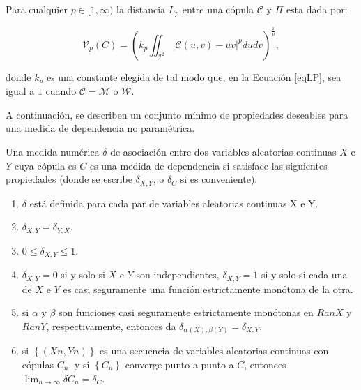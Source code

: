 \begin{defn}\label{lp}
    Para cualquier $p \in[1, \infty)$ la distancia $L_p$ entre una cópula $\mathcal{C}$ y $\Pi$ esta dada por:

    \begin{equation}\label{eqLP}
        \mathcal{V}_p(C)=\left(k_p \iint_{\mathcal{I}^2}|\mathcal{C}(u, v)-u v|^p d u d v\right)^{\frac{1}{p}},
    \end{equation}

    donde $k_p$ es una constante elegida de tal modo que, en la Ecuación \eqref{eqLP}, sea igual a $1$ cuando $\mathcal{C}=\mathcal{M}$ o $\mathcal{W}$.
\end{defn}


A continuación, se describen un conjunto mínimo de propiedades deseables para una medida de dependencia no paramétrica. 

\begin{defn}
    Una medida numérica $\delta$ de asociación entre dos variables aleatorias continuas $X$ e $Y$ cuya cópula es $C$ es una medida de dependencia si satisface las siguientes propiedades (donde se escribe $\delta_{X,Y}$, o $\delta_C$ si es conveniente):

    \begin{enumerate}
        \item $\delta$ está definida para cada par de variables aleatorias continuas X e Y.
        \item $\delta_{X,Y} = \delta_{Y,X}$.
        \item $0 \leq \delta_ {X,Y} \leq 1$.
        \item  $\delta_{X,Y} = 0$ si y solo si $X$ e $Y$ son independientes, $\delta_{X,Y} = 1$ si y solo si cada una de $X$ e $Y$ es casi seguramente una función estrictamente monótona de la otra.
        \item si $\alpha$ y $\beta$ son funciones casi seguramente estrictamente monótonas en $RanX$ y $RanY$, respectivamente, entonces da $\delta_{\alpha(X), \beta(Y)} = \delta_{X,Y}$.
        \item si $\left\{ ( Xn ,Yn )\right\}$ es una secuencia de variables aleatorias continuas con cópulas $C_n$, y si $\left\{ C_n\right\}$ converge punto a punto a $C$, entonces $\lim_{n \to \infty} \delta C_n = \delta_C$.
    \end{enumerate}
\end{defn}

